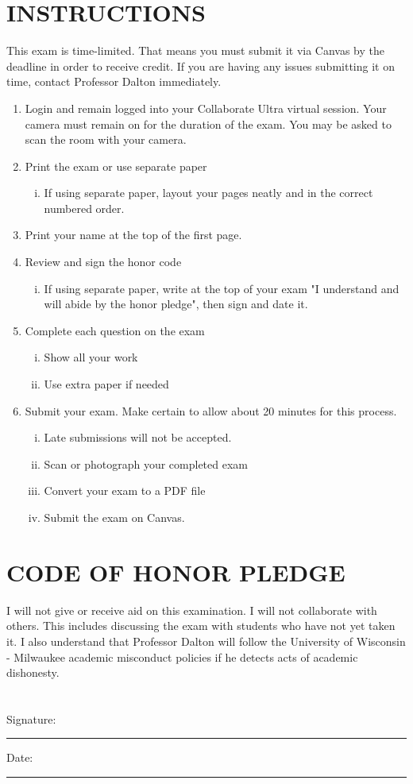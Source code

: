 \documentclass[12pt,letterpaper]{article}
\begin{document}
\section*{INSTRUCTIONS}
This exam is time-limited. That means you must submit it via Canvas by the deadline in order to receive credit. If you are having any issues submitting it on time, contact Professor Dalton immediately.
\begin{enumerate}
	\item Login and remain logged into your Collaborate Ultra virtual session. Your camera must remain on for the duration of the exam. You may be asked to scan the room with your camera.
	\item Print the exam or use separate paper
	\begin{enumerate}[(i)]
		\item If using separate paper, layout your pages neatly and in the correct numbered order.
	\end{enumerate}
	\item Print your name at the top of the first page.
	\item Review and sign the honor code
	\begin{enumerate}[(i)]
		\item If using separate paper, write at the top of your exam "I understand and will abide by the honor pledge", then sign and date it.
	\end{enumerate}
	\item Complete each question on the exam
	\begin{enumerate}[(i)]
		\item Show all your work
		\item Use extra paper if needed
	\end{enumerate}
	\item Submit your exam. Make certain to allow about 20 minutes for this process.
	\begin{enumerate}[(i)]
		\item Late submissions will not be accepted.
		\item Scan or photograph your completed exam
		\item Convert your exam to a PDF file
		\item Submit the exam on Canvas.
	\end{enumerate}
\end{enumerate}

\section*{CODE OF HONOR PLEDGE}

I will not give or receive aid on this examination. I will not collaborate with others. This includes discussing the exam with students who have not yet taken it. I also understand that Professor Dalton will follow the University of Wisconsin - Milwaukee academic misconduct policies if he detects acts of academic dishonesty.
\\\\\\
Signature:\rule{8cm}{0.4pt} Date:\rule{4cm}{0.4pt}
\end{document}
